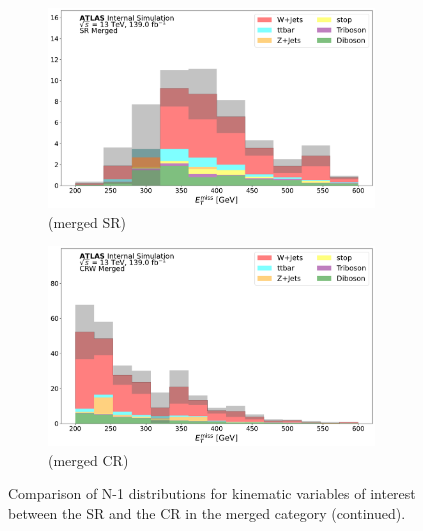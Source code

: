 \begin{figure}[htbp]
   \begin{subfigure}{0.45\textwidth}
     \includegraphics[width = 0.95\textwidth]{Figures/App_SR_CR_distributions/SR1L_Merged/MetTST_met_N_1.pdf}
    \caption{\met (merged SR)}
    \label{fig:N_1_SR_merged_met}
     \end{subfigure}
    \begin{subfigure}{0.45\textwidth}
     \includegraphics[width = 0.95\textwidth]{Figures/App_SR_CR_distributions/CRW_Merged/MetTST_met_N_1.pdf}
     \caption{\met (merged \wjets CR)}
     \label{fig:N_1_CRW_merged_met}
     \end{subfigure}
     \caption{Comparison of N-1 distributions for kinematic variables of interest between the SR and the \wjets CR in the merged category (continued).}
  \end{figure}
  
  \captionsetup[figure]{list=no}


